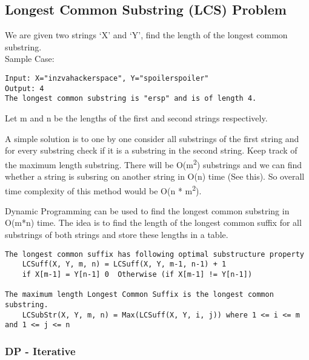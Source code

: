 \documentclass[12pt]{article}
\begin{document}
	\subsection{Longest Common Substring (LCS) Problem}
	We are given two strings ‘X’ and ‘Y’, find the length of the longest common substring.\\
	Sample Case:
	\begin{lstlisting}[numbers=none, frame=none]
Input: X="inzvahackerspace", Y="spoilerspoiler"
Output: 4
The longest common substring is "ersp" and is of length 4.
	\end{lstlisting}
	
	Let m and n be the lengths of the first and second strings respectively.

    A simple solution is to one by one consider all substrings of the first string and for every substring check if it is a substring in the second string. Keep track of the maximum length substring. There will be O(m\textsuperscript{2}) substrings and we can find whether a string is subsring on another string in O(n) time (See this). So overall time complexity of this method would be O(n * m\textsuperscript{2}).

    Dynamic Programming can be used to find the longest common substring in O(m*n) time. The idea is to find the length of the longest common suffix for all substrings of both strings and store these lengths in a table.
	
	\begin{lstlisting}[numbers=none, frame=none]
The longest common suffix has following optimal substructure property
    LCSuff(X, Y, m, n) = LCSuff(X, Y, m-1, n-1) + 1
    if X[m-1] = Y[n-1] 0  Otherwise (if X[m-1] != Y[n-1])

The maximum length Longest Common Suffix is the longest common substring.
    LCSubStr(X, Y, m, n) = Max(LCSuff(X, Y, i, j)) where 1 <= i <= m and 1 <= j <= n
	\end{lstlisting}
	\newpage
	\subsubsection{DP - Iterative}
	
\end{document}
